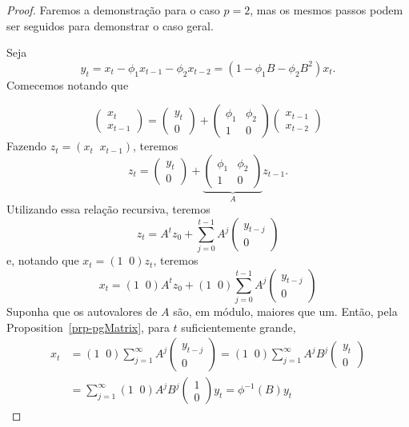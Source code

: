 \documentclass[
  letterpaper,
  DIV=11,
  numbers=noendperiod]{scrartcl}
\theoremstyle{plain}
\theoremstyle{plain}
\theoremstyle{definition}
\theoremstyle{definition}
\theoremstyle{remark}
\begin{document}
\begin{proof}

Faremos a demonstração para o caso \(p=2\), mas os mesmos passos podem
ser seguidos para demonstrar o caso geral.

Seja \[y_t=x_t-\phi_1x_{t-1}-\phi_2 x_{t-2}=(1-\phi_1B-\phi_2 B^2)x_t.\]
Comecemos notando que

\[\left(\begin{array}{c} x_t \\ x_{t-1}\end{array}\right)=\left(\begin{array}{c} y_t \\ 0\end{array}\right)+\left(\begin{array}{cc} \phi_1 & \phi_2 \\ 1 & 0\end{array}\right)\left(\begin{array}{c} x_{t-1} \\ x_{t-2}\end{array}\right)\]
Fazendo \(z_t=(x_t\;\;x_{t-1})\), teremos
\[z_t=\left(\begin{array}{c} y_t \\ 0\end{array}\right)+\underbrace{\left(\begin{array}{cc} \phi_1 & \phi_2 \\ 1 & 0\end{array}\right)}_{A}z_{t-1}.\]
Utilizando essa relação recursiva, teremos
\[z_t=A^t z_{0}+\sum_{j=0}^{t-1}A^j\left(\begin{array}{c} y_{t-j} \\ 0\end{array}\right)\]
e, notando que \(x_t=(1\;\;0)z_t\), teremos
\[x_t=(1\;\;0)A^t z_{0}+(1\;\;0)\sum_{j=0}^{t-1}A^j\left(\begin{array}{c} y_{t-j} \\ 0\end{array}\right)\]
Suponha que os autovalores de \(A\) são, em módulo, maiores que um.
Então, pela Proposition~\ref{prp-pgMatrix}, para \(t\) suficientemente
grande,
\[\begin{align}x_t&=(1\;\;0)\sum_{j=1}^\infty A^j \left(\begin{array}{c} y_{t-j} \\ 0\end{array}\right)=(1\;\;0)\sum_{j=1}^\infty A^j B^j\left(\begin{array}{c} y_{t} \\ 0\end{array}\right)\\&=\sum_{j=1}^\infty (1\;\;0)A^j B^j\left(\begin{array}{c} 1 \\ 0\end{array}\right)y_{t}=\phi^{-1}(B)y_t\end{align}\]

\end{proof}
\end{document}
